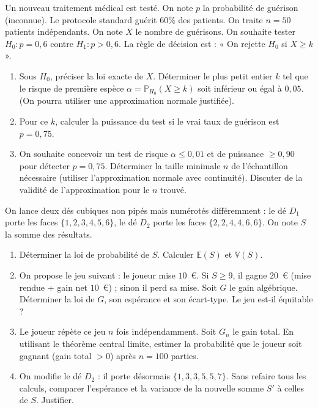 \documentclass[11pt]{article}
\begin{document}
\begin{exercice}
Un nouveau traitement médical est testé. On note $p$ la probabilité de guérison (inconnue). Le protocole standard guérit $60\%$ des patients. On traite $n=50$ patients indépendants. On note $X$ le nombre de guérisons. On souhaite tester $H_0 : p=0,6$ contre $H_1 : p>0,6$. La règle de décision est : « On rejette $H_0$ si $X \geq k$ ».
\begin{enumerate}
    \item Sous $H_0$, préciser la loi exacte de $X$. Déterminer le plus petit entier $k$ tel que le risque de première espèce $\alpha = \mathbb{P}_{H_0}(X \geq k)$ soit inférieur ou égal à $0,05$. (On pourra utiliser une approximation normale justifiée).
    \item Pour ce $k$, calculer la puissance du test si le vrai taux de guérison est $p=0,75$.
    \item On souhaite concevoir un test de risque $\alpha \leq 0,01$ et de puissance $\geq 0,90$ pour détecter $p=0,75$. Déterminer la taille minimale $n$ de l'échantillon nécessaire (utiliser l'approximation normale avec continuité). Discuter de la validité de l'approximation pour le $n$ trouvé.
\end{enumerate}
\end{exercice}

\begin{exercice}
On lance deux dés cubiques non pipés mais numérotés différemment : le dé $D_1$ porte les faces $\{1,2,3,4,5,6\}$, le dé $D_2$ porte les faces $\{2,2,4,4,6,6\}$. On note $S$ la somme des résultats.
\begin{enumerate}
    \item Déterminer la loi de probabilité de $S$. Calculer $\mathbb{E}(S)$ et $\mathbb{V}(S)$.
    \item On propose le jeu suivant : le joueur mise $10$~€. Si $S \geq 9$, il gagne $20$~€ (mise rendue + gain net $10$~€) ; sinon il perd sa mise. Soit $G$ le gain algébrique. Déterminer la loi de $G$, son espérance et son écart-type. Le jeu est-il équitable ?
    \item Le joueur répète ce jeu $n$ fois indépendamment. Soit $G_n$ le gain total. En utilisant le théorème central limite, estimer la probabilité que le joueur soit gagnant (gain total $>0$) après $n=100$ parties.
    \item On modifie le dé $D_2$ : il porte désormais $\{1,3,3,5,5,7\}$. Sans refaire tous les calculs, comparer l'espérance et la variance de la nouvelle somme $S'$ à celles de $S$. Justifier.
\end{enumerate}
\end{exercice}
\end{document}

